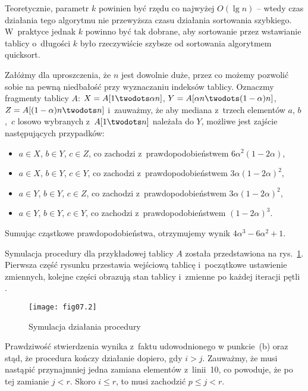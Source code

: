 Teoretycznie, parametr $k$ powinien być rzędu co najwyżej $O(\lg n)$ -- wtedy czas działania tego algorytmu nie przewyższa czasu działania sortowania szybkiego. W~praktyce jednak $k$ powinno być tak dobrane, aby sortowanie przez wstawianie tablicy o~długości $k$ było rzeczywiście szybsze od sortowania algorytmem quicksort.

\exercise %
Załóżmy dla uproszczenia, że $n$ jest dowolnie duże, przez co możemy pozwolić sobie na pewną niedbałość przy wyznaczaniu indeksów tablicy. Oznaczmy fragmenty tablicy $A$: $X=A[1\twodots\alpha n]$, $Y=A[\alpha n\twodots(1-\alpha)n]$, $Z=A[(1-\alpha)n\twodots n]$ i~zauważmy, że aby mediana z~trzech elementów $a$, $b$,~$c$ losowo wybranych z~$A[1\twodots n]$ należała do $Y$, możliwe jest zajście następujących przypadków:
\begin{itemize}
	\item $a\in X$, $b\in Y$, $c\in Z$, co zachodzi z~prawdopodobieństwem $6\alpha^2(1-2\alpha)$,
	\item $a\in X$, $b\in Y$, $c\in Y$, co zachodzi z~prawdopodobieństwem $3\alpha(1-2\alpha)^2$,
	\item $a\in Y$, $b\in Y$, $c\in Z$, co zachodzi z~prawdopodobieństwem $3\alpha(1-2\alpha)^2$,
	\item $a\in Y$, $b\in Y$, $c\in Y$, co zachodzi z~prawdopodobieństwem $(1-2\alpha)^3$.
\end{itemize}
Sumując cząstkowe prawdopodobieństwa, otrzymujemy wynik $4\alpha^3-6\alpha^2+1$.

\problems


\subproblem %
Symulacja procedury  dla przykładowej tablicy $A$ została przedstawiona na rys.~\ref{fig:7-1a}. Pierwsza część rysunku przestawia wejściową tablicę i~początkowe ustawienie zmiennych, kolejne części obrazują stan tablicy i~zmienne po każdej iteracji pętli .
\begin{figure}[ht]
	\begin{center}
		\texttt{[image: fig07.2]}
	\end{center}
	\caption{Symulacja działania procedury } \label{fig:7-1a}
\end{figure}

\subproblem %

\subproblem %
Prawdziwość stwierdzenia wynika z~faktu udowodnionego w punkcie~(b) oraz stąd, że procedura kończy działanie dopiero, gdy $i>j$. Zauważmy, że musi nastąpić przynajmniej jedna zamiana elementów z~linii~10, co powoduje, że po tej zamianie $j<r$. Skoro $i\le r$, to musi zachodzić $p\le j<r$.

